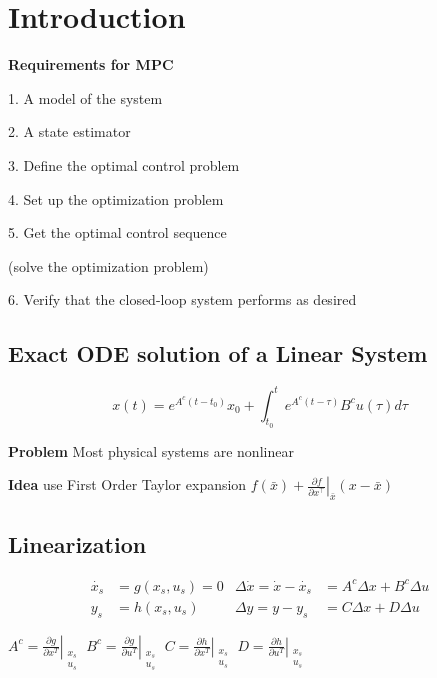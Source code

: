 \section{Introduction}

\textbf{Requirements for MPC}

1. A model of the system

2. A state estimator

3. Define the optimal control problem

4. Set up the optimization problem

5. Get the optimal control sequence

(solve the optimization problem)

6. Verify that the closed-loop system performs as desired

\subsection{Exact ODE solution of a Linear System}

\[
	x(t) = e^{A^c(t-t_0)}x_0 +
	\textstyle\int_{t_0}^{t}e^{A^c(t-\tau)}B^c u(\tau)d\tau
\]

\textbf{Problem} Most physical systems are nonlinear

\textbf{Idea} use First Order Taylor expansion
$f(\bar{x}) + \left. \frac{\partial f}{\partial x^\top} \right
	\rvert_{\bar{x}} (x-\bar{x})$

\subsection{Linearization}


\[\begin{aligned}
		\dot{x_s} & =g(x_s,u_s) = 0
		          & \Delta \dot{x}  =\dot{x} -\dot{x_s}
		          & = A^c\Delta x + B^c\Delta u
		\\
		y_s       & = h(x_s,u_s)
		          & \Delta y        = y - y_s
		          & = C\Delta x + D\Delta u
	\end{aligned} \]


$A^c= \left.\frac{\partial g}{\partial x^T}\right|_{\substack{x_s \\u_s}} $
$B^c= \left.\frac{\partial g}{\partial u^T}\right|_{\substack{x_s \\u_s}} $
$C= \left.\frac{\partial h}{\partial x^T}\right|_{\substack{x_s \\u_s}} $
$D= \left.\frac{\partial h}{\partial u^T}\right|_{\substack{x_s \\u_s}} $

